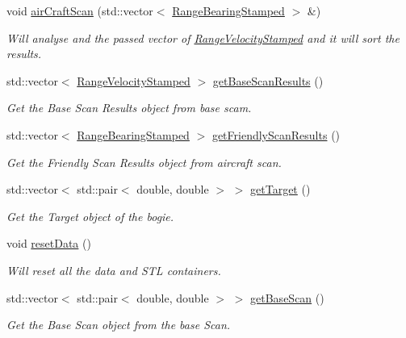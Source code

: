 \begin{DoxyCompactItemize}
void \hyperlink{classScanner_a61dd33aeecd220e4dec5f9cbd6403f9e}{air\+Craft\+Scan} (std\+::vector$<$ \hyperlink{structRangeBearingStamped}{Range\+Bearing\+Stamped} $>$ \&)
\begin{DoxyCompactList}\small\item\em Will analyse and the passed vector of \hyperlink{structRangeVelocityStamped}{Range\+Velocity\+Stamped} and it will sort the results. \end{DoxyCompactList}\item 
std\+::vector$<$ \hyperlink{structRangeVelocityStamped}{Range\+Velocity\+Stamped} $>$ \hyperlink{classScanner_a59590dd900ab1c5cc362fa4a00df533d}{get\+Base\+Scan\+Results} ()
\begin{DoxyCompactList}\small\item\em Get the Base Scan Results object from base scam. \end{DoxyCompactList}\item 
std\+::vector$<$ \hyperlink{structRangeBearingStamped}{Range\+Bearing\+Stamped} $>$ \hyperlink{classScanner_a27b2ba73647d40946e00bceb824712e9}{get\+Friendly\+Scan\+Results} ()
\begin{DoxyCompactList}\small\item\em Get the Friendly Scan Results object from aircraft scan. \end{DoxyCompactList}\item 
std\+::vector$<$ std\+::pair$<$ double, double $>$ $>$ \hyperlink{classScanner_a556ac0598666bf9543099daef4655d6b}{get\+Target} ()
\begin{DoxyCompactList}\small\item\em Get the Target object of the bogie. \end{DoxyCompactList}\item 
\mbox{\label{classScanner_a95dea82a0db3f7ca8cf5152c85f89239}} 
void \hyperlink{classScanner_a95dea82a0db3f7ca8cf5152c85f89239}{reset\+Data} ()
\begin{DoxyCompactList}\small\item\em Will reset all the data and S\+TL containers. \end{DoxyCompactList}\item 
std\+::vector$<$ std\+::pair$<$ double, double $>$ $>$ \hyperlink{classScanner_a26f1e15d585005c467740b4bed4329c0}{get\+Base\+Scan} ()
\begin{DoxyCompactList}\small\item\em Get the Base Scan object from the base Scan. \end{DoxyCompactList}\item 

\end{DoxyCompactItemize}

